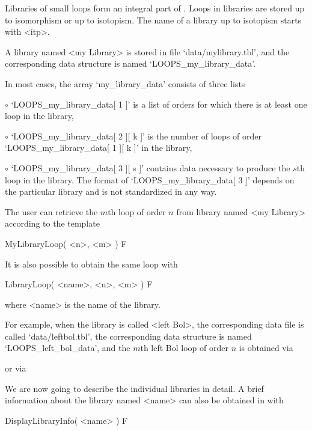 
\label{lib} Libraries of small loops form an integral part of {\LOOPS}. Loops
in libraries are stored up to isomorphism or up to isotopism. The name of a
library up to isotopism starts with <itp>.


A library named <my Library> is stored in file `data/mylibrary.tbl', and the
corresponding data structure is named `LOOPS_my_library_data'.

In most cases, the array `my_library_data' consists of three lists
\beginlist%
\item{$\circ$}
    `LOOPS_my_library_data[ 1 ]' is a list of orders for which there is at
    least one loop in the library,
\item{$\circ$}
    `LOOPS_my_library_data[ 2 ][ k ]' is the number of loops of order
    `LOOPS_my_library_data[ 1 ][ k ]' in the library,
\item{$\circ$}
    `LOOPS_my_library_data[ 3 ][ s ]' contains data necessary to produce the
    $s$th loop in the library.
\endlist
The format of `LOOPS_my_library_data[ 3 ]' depends on the particular library and is
not standardized in any way.

The user can retrieve the $m$th loop of order $n$ from library named <my
Library> according to the template

\>MyLibraryLoop( <n>, <m> ) F

It is also possible to obtain the same loop with

\>LibraryLoop( <name>, <n>, <m> ) F

where <name> is the name of the library.

For example, when the library is called <left Bol>, the corresponding data file
is called `data/leftbol.tbl', the corresponding data structure is named
`LOOPS_left_bol_data', and the $m$th left Bol loop of order $n$ is obtained via


or via


We are now going to describe the individual libraries in detail. A brief
information about the library named <name> can also be obtained in {\LOOPS}
with

\>DisplayLibraryInfo( <name> ) F

